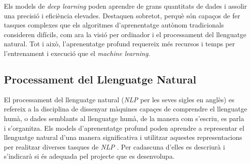 Els models de \textit{deep learning} poden aprendre de grans quantitats de dades i assolir una precisió i eficiència elevades. Destaquen sobretot, perquè són capaços de fer tasques complexes que els algoritmes d'aprenentatge autònom tradicionals consideren difícils, com ara la visió per ordinador i el processament del llenguatge natural. Tot i això, l'aprenentatge profund requereix més recursos i temps per l'entrenament i execució que el \textit{machine learning}.

\subsection{Processament del Llenguatge Natural} \label{ssec:definicio_NLP}
El processament del llenguatge natural (\textit{NLP} per les seves sigles en anglès) es refereix a la disciplina de dissenyar màquines capaçes de comprendre el llenguatge humà, o dades semblants al llenguatge humà, de la manera com s'escriu, es parla i s'organitza. Els models d'aprenentatge profund poden aprendre a representar el llenguatge natural d'una manera significativa i utilitzar aquestes representacions per realitzar diverses tasques de \textit{NLP} \cite{Hugging-Face}. Per cadascuna d'elles es descriurà i s'indicarà si és adequada pel projecte que es desenvolupa.

